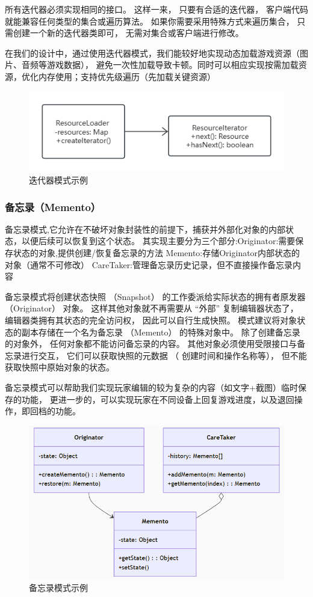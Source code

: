 \documentclass[12pt]{ctexart} %
\begin{document}
所有迭代器必须实现相同的接口。 这样一来， 只要有合适的迭代器， 客户端代码就能兼容任何类型的集合或遍历算法。 
如果你需要采用特殊方式来遍历集合， 只需创建一个新的迭代器类即可， 无需对集合或客户端进行修改。

在我们的设计中，通过使用迭代器模式，我们能较好地实现动态加载游戏资源（图片、音频等游戏数据），
避免一次性加载导致卡顿。同时可以相应实现按需加载资源，优化内存使用；支持优先级遍历（先加载关键资源）
\begin{figure}[H]
  \centering
  \includegraphics[width=1\textwidth]{diedai.png}
  \caption{迭代器模式示例}
\end{figure}
\subsubsection{备忘录（Memento）} 
备忘录模式,它允许在不破坏对象封装性的前提下，捕获并外部化对象的内部状态，以便后续可以恢复到这个状态。
其实现主要分为三个部分:Originator:需要保存状态的对象,提供创建/恢复备忘录的方法
Memento:存储Originator内部状态的对象（通常不可修改）
CareTaker:管理备忘录历史记录，但不直接操作备忘录内容

备忘录模式将创建状态快照 （Snapshot） 的工作委派给实际状态的拥有者原发器 （Originator） 对象。 
这样其他对象就不再需要从 “外部” 复制编辑器状态了， 编辑器类拥有其状态的完全访问权， 因此可以自行生成快照。
模式建议将对象状态的副本存储在一个名为备忘录 （Memento） 的特殊对象中。 
除了创建备忘录的对象外， 任何对象都不能访问备忘录的内容。 
其他对象必须使用受限接口与备忘录进行交互， 它们可以获取快照的元数据 （
创建时间和操作名称等）， 但不能获取快照中原始对象的状态。

备忘录模式可以帮助我们实现玩家编辑的较为复杂的内容（如文字+截图）临时保存的功能，
更进一步的，可以实现玩家在不同设备上回复游戏进度，以及退回操作，即回档的功能。
\begin{figure}[H]
  \centering
  \includegraphics[width=1\textwidth]{beiwang.png}
  \caption{备忘录模式示例}
\end{figure}
\end{document}

